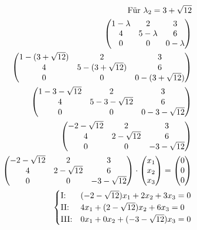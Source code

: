 \begin{align*}
    \text{Für } \lambda_2 = 3 + \sqrt{12}                           \\
    \begin{pmatrix}
        1 - \lambda & 2           & 3           \\
        4           & 5 - \lambda & 6           \\
        0           & 0           & 0 - \lambda
    \end{pmatrix}                         \\
    \begin{pmatrix}
        1 - (3 + \sqrt{12}) & 2                   & 3                   \\
        4                   & 5 - (3 + \sqrt{12}) & 6                   \\
        0                   & 0                   & 0 - (3 + \sqrt{12})
    \end{pmatrix} \\
    \begin{pmatrix}
        1 - 3 - \sqrt{12} & 2                 & 3                 \\
        4                 & 5 - 3 - \sqrt{12} & 6                 \\
        0                 & 0                 & 0 - 3 - \sqrt{12}
    \end{pmatrix}       \\
    \begin{pmatrix}
        -2 - \sqrt{12} & 2             & 3              \\
        4              & 2 - \sqrt{12} & 6              \\
        0              & 0             & -3 - \sqrt{12}
    \end{pmatrix}                 \\
    \begin{pmatrix}
        -2 - \sqrt{12} & 2             & 3              \\
        4              & 2 - \sqrt{12} & 6              \\
        0              & 0             & -3 - \sqrt{12}
    \end{pmatrix} \cdot \begin{pmatrix}
                            x_1 \\ x_2 \\ x_3
                        \end{pmatrix} = \begin{pmatrix}
                                            0 \\ 0 \\ 0
                                        \end{pmatrix}              \\
    \begin{cases}
        \text{I:\@}   & (-2 - \sqrt{12})x_1 + 2x_2 + 3x_3 = 0 \\
        \text{II:\@}  & 4x_1 + (2 - \sqrt{12})x_2 + 6x_3 = 0  \\
        \text{III:\@} & 0x_1 + 0x_2 + (-3 - \sqrt{12})x_3 = 0
    \end{cases}
\end{align*}

